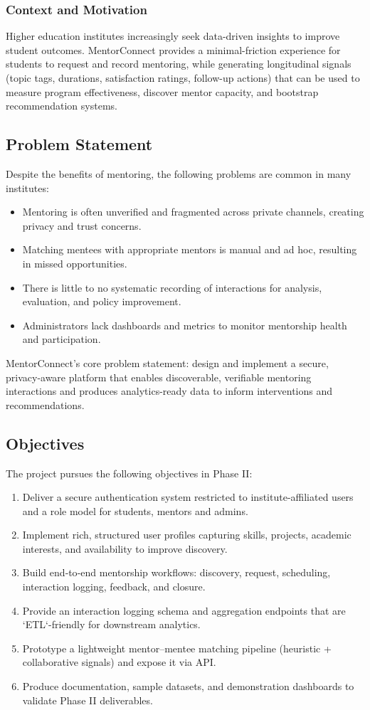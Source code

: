 \documentclass[12pt,singleside,a4paper]{article}
\begin{document}
\subsubsection{Context and Motivation}
Higher education institutes increasingly seek data-driven insights to improve student outcomes. MentorConnect provides a minimal-friction experience for students to request and record mentoring, while generating longitudinal signals (topic tags, durations, satisfaction ratings, follow-up actions) that can be used to measure program effectiveness, discover mentor capacity, and bootstrap recommendation systems.

\subsection{Problem Statement}
Despite the benefits of mentoring, the following problems are common in many institutes:
\begin{itemize}
  \item Mentoring is often unverified and fragmented across private channels, creating privacy and trust concerns.
  \item Matching mentees with appropriate mentors is manual and ad hoc, resulting in missed opportunities.
  \item There is little to no systematic recording of interactions for analysis, evaluation, and policy improvement.
  \item Administrators lack dashboards and metrics to monitor mentorship health and participation.
\end{itemize}
MentorConnect's core problem statement: design and implement a secure, privacy-aware platform that enables discoverable, verifiable mentoring interactions and produces analytics-ready data to inform interventions and recommendations.

\subsection{Objectives}
The project pursues the following objectives in Phase II:
\begin{enumerate}
  \item Deliver a secure authentication system restricted to institute-affiliated users and a role model for students, mentors and admins.
  \item Implement rich, structured user profiles capturing skills, projects, academic interests, and availability to improve discovery.
  \item Build end‑to‑end mentorship workflows: discovery, request, scheduling, interaction logging, feedback, and closure.
  \item Provide an interaction logging schema and aggregation endpoints that are `ETL`-friendly for downstream analytics.
  \item Prototype a lightweight mentor–mentee matching pipeline (heuristic + collaborative signals) and expose it via API.
  \item Produce documentation, sample datasets, and demonstration dashboards to validate Phase II deliverables.
\end{enumerate}
\end{document}
